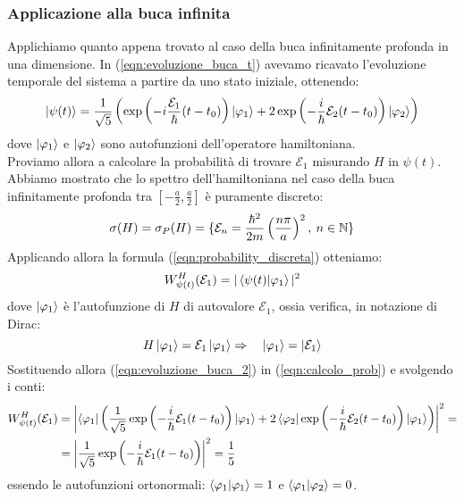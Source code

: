 \documentclass[../../FisicaTeorica.tex]{subfiles}
\begin{document}
\subsubsection{Applicazione alla buca infinita}
Applichiamo quanto appena trovato al caso della buca infinitamente profonda in una dimensione. In (\ref{eqn:evoluzione_buca_t}) avevamo ricavato l'evoluzione temporale del sistema a partire da uno stato iniziale, ottenendo:
\begin{equation}
\ket{\psi(t)}=\frac{1}{\sqrt{5}}\left(\exp\left(-i\frac{\mathcal{E}_1}{\hbar}(t-t_0)\right)\ket{\varphi_1}
+ 2\exp \left(-\frac{i}{\hbar}\mathcal{E}_2(t-t_0)\right)\ket{\varphi_2}
 \right)
 \label{eqn:evoluzione_buca_2}
\end{equation}
dove $\ket{\varphi_1}$ e $\ket{\varphi_2}$ sono autofunzioni dell'operatore hamiltoniana.\\
Proviamo allora a calcolare la probabilità di trovare $\mathcal{E}_1$ misurando $H$ in $\psi(t)$.\\
Abbiamo mostrato che lo spettro dell'hamiltoniana nel caso della buca infinitamente profonda tra $[-\frac{a}{2},\frac{a}{2}]$ è puramente discreto:
\[
\sigma(H)=\sigma_P(H)=\{\mathcal{E}_n = \frac{\hbar^2}{2m}\left(\frac{n\pi}{a} \right)^2,\>n\in\mathbb{N}\}
\]
Applicando allora la formula (\ref{eqn:probability_discreta}) otteniamo:
\begin{equation}
W_{\psi(t)}^H(\mathcal{E}_1) = |\braket{\psi(t)|\varphi_1}|^2
\label{eqn:calcolo_prob}
\end{equation}
dove $\ket{\varphi_1}$ è l'autofunzione di $H$ di autovalore $\mathcal{E}_1$, ossia verifica, in notazione di Dirac:
\[
H\ket{\varphi_1}=\mathcal{E}_1 \ket{\varphi_1}\Rightarrow \quad \ket{\varphi_1} = \ket{\mathcal{E}_1}
\]
Sostituendo allora (\ref{eqn:evoluzione_buca_2}) in (\ref{eqn:calcolo_prob}) e svolgendo i conti:
\begin{align*}
W_{\psi(t)}^H(\mathcal{E}_1) &= \left| \bra{\varphi_1}
\left (
\frac{1}{\sqrt{5}}\exp\left(-\frac{i}{\hbar}\mathcal{E}_1(t-t_0) \right)\ket{\varphi_1} +
2\bra{\varphi_2}\exp\left(-\frac{i}{\hbar}\mathcal{E}_2 (t-t_0)\right)\ket{\varphi_1}
\right) \right |^2 = \\
&= \left |\frac{1}{\sqrt{5}} \exp\left(-\frac{i}{\hbar} \mathcal{E}_1(t-t_0)\right) \right |^2=\frac{1}{5}
\end{align*}
essendo le autofunzioni ortonormali: $\braket{\varphi_1|\varphi_1}=1$ e $\braket{\varphi_1|\varphi_2}=0$.
\end{document}
